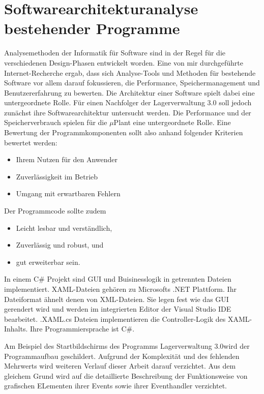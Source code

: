\chapter{Softwarearchitekturanalyse bestehender Programme}\label{Kap2}

    Analysemethoden der Informatik für Software sind in der Regel für die verschiedenen Design-Phasen entwickelt worden.
    Eine von mir durchgeführte Internet-Recherche ergab, dass sich Analyse-Tools und Methoden für bestehende Software vor
    allem darauf fokussieren, die Performance, Speichermanagement und Benutzererfahrung zu bewerten.
    Die Architektur einer Software spielt dabei eine untergeordnete Rolle.
    Für einen Nachfolger der Lagerverwaltung 3.0 soll jedoch zunächst ihre Softwarearchitektur untersucht werden.
    Die Performance und der Speicherverbrauch spielen für die $\mu$Plant eine untergeordnete Rolle.
    Eine Bewertung der Programmkomponenten sollt also anhand folgender Kriterien bewertet werden:

    \begin{itemize}
        \item Ihrem Nutzen für den Anwender
        \item Zuverlässigkeit im Betrieb
        \item Umgang mit erwartbaren Fehlern
    \end{itemize}

    Der Programmcode sollte zudem
    \begin{itemize}
        \item Leicht lesbar und verständlich,
        \item Zuverlässig und robust, und
        \item gut erweiterbar sein.
    \end{itemize}
    In einem C$\#$ Projekt sind GUI und Buisinesslogik in getrennten Dateien implementiert.
    XAML-Dateien gehören zu Microsofts .NET Plattform. 
    Ihr Dateiformat ähnelt denen von XML-Dateien. 
    Sie legen fest wie das GUI gerendert wird und werden im integrierten Editor der Visual Studio IDE bearbeitet.
    .XAML.cs Dateien implementieren die Controller-Logik des XAML-Inhalts. 
    Ihre Programmiersprache ist C$\#$.

    Am Beispiel des Startbildschirms des Programms \glqq Lagerverwaltung 3.0\grqq wird der Programmaufbau geschildert.
    Aufgrund der Komplexität und des fehlenden Mehrwerts wird weiteren Verlauf dieser Arbeit darauf verzichtet.
    Aus dem gleichem Grund wird auf die detaillierte Beschreibung der Funktionsweise von grafischen ELementen ihrer Events
    sowie ihrer Eventhandler verzichtet.

